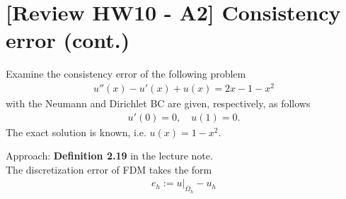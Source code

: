 \documentclass[12pt]{article}
\begin{document}
\section{[Review HW10 - A2] Consistency error (cont.)}
\begin{example}
	Examine the consistency error of the following problem
	\begin{align*}
		u''(x) - u'(x) + u(x) = 2x -1 -x^2
	\end{align*}
	with the Neumann and Dirichlet BC are given, respectively, as follows
	\begin{align*}
		u'(0) = 0, \quad u(1) = 0.
	\end{align*}
	The exact solution is known, i.e. $u(x) = 1-x^2$.
\end{example}
Approach: \textbf{Definition 2.19} in the lecture note.\\
The discretization error of FDM takes the form
\begin{align}
	e_{h} := u\big|_{\overline{\Omega}_{h}} - u_{h}
\end{align}
\end{document}
